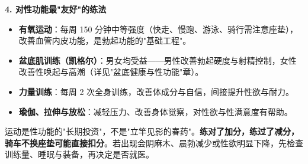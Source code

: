 \noindent\textbf{4. 对性功能最"友好"的练法}

\begin{itemize}
	\item \textbf{有氧运动}：每周 150 分钟中等强度（快走、慢跑、游泳、骑行需注意座垫），改善血管内皮功能，是勃起功能的"基础工程"。
	\item \textbf{盆底肌训练（凯格尔）}：男女均受益——男性改善勃起硬度与射精控制，女性改善性唤起与高潮（详见"盆底健康与性功能"章）。
	\item \textbf{力量训练}：每周 2 次全身训练，改善体成分与自信，间接提升性欲与耐力。
	\item \textbf{瑜伽、拉伸与放松}：减轻压力、改善身体觉察，对性欲与性满意度有帮助。
\end{itemize}

\begin{tcolorbox}[colback=pink!5!white,colframe=red!50!black,title=贴心小叮咛]
运动是性功能的"长期投资"，不是"立竿见影的春药"。\textbf{练对了加分，练过了减分，骑车不换座垫可能直接扣分}。若出现会阴麻木、晨勃减少或性欲明显下降，先检查训练量、睡眠与装备，再决定是否就医。
\end{tcolorbox}
